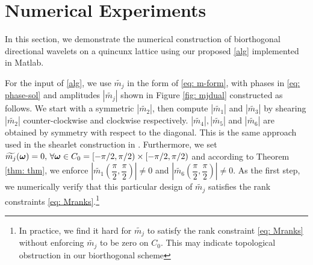 \begin{comment}
\subsection{solving $m_i$}
In the final step, we substitute $\mc{0}$ and $m_0^C(\V{\omega})$ into \eqref{eq: LS-new} and rewrite it into the following linear system,
\begin{align}\label{eq: mi}
\overline{\M}[:,2:7]\,\mathbf{m}[2:7](\V{\omega}) = 
\begin{bmatrix}
1-m_0^C\overline{\widetilde{m_0}^C}(\V{\omega})\\
0\\
-m_0^C\overline{\widetilde{m_0}^C}(\V{\omega}+\V{\pi}_2)\\
\vdots \\
0
\end{bmatrix}
=:\mathbf{b}(\V{\omega}).
\end{align}
The solution of \eqref{eq: mi} depends only on $m_0^C\overline{\widetilde{m_0}^C}$, or equivalently $m_0\overline{\widetilde{m_0}}$. 
\end{comment}

\section{Numerical Experiments}\label{sec: numerics}

In this section, we demonstrate the numerical construction of biorthogonal directional wavelets on a quincunx lattice using our proposed \ref{alg} implemented in Matlab.

For the input of \ref{alg}, we use $\widetilde{m_j}$ in the form of \eqref{eq: m-form}, with phases in \eqref{eq: phase-sol} and amplitudes $|\widetilde{m_j}|$ shown in Figure \ref{fig: mjdual} constructed as follows. We start with a symmetric $|\widetilde{m_2}|$, then compute $|\widetilde{m_1}|$ and $|\widetilde{m_3}|$ by shearing $|\widetilde{m_2}|$ counter-clockwise and clockwise respectively. $|\widetilde{m_4}|, |\widetilde{m_5}|$ and $|\widetilde{m_6}|$ are obtained by symmetry with respect to the diagonal. This is the same approach used in the shearlet construction in \cite{kutyniok2012digital}. Furthermore, we set $\widetilde{m_{j}}(\boldsymbol{\omega}) = 0,\,\forall \boldsymbol{\omega}\in C_0 = [-\pi/2,\pi/2)\times [-\pi/2, \pi/2)$ and according to Theorem \ref{thm: thm}, we enforce $|\widetilde{m_1}(\dfrac{\pi}{2},\dfrac{\pi}{2})|\neq 0$ and $|\widetilde{m_6}(\dfrac{\pi}{2},\dfrac{\pi}{2})|\neq 0$. As the first step, we numerically verify that this particular design of $\widetilde{m_j}$ satisfies the rank constraints \eqref{eq: Mranks}.\footnote{In practice, we find it hard for $\widetilde{m_j}$ to satisfy the rank constraint \eqref{eq: Mranks} without enforcing $\widetilde{m_j}$ to be zero on $C_0$. This may indicate topological obstruction in our biorthogonal scheme}

